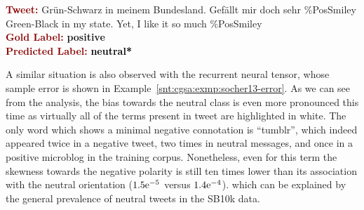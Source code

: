 \begin{example}\label{snt:cgsa:exmp:rae-error}
  \noindent\textup{\bfseries\textcolor{darkred}{Tweet:}} {\upshape
    \colorbox{white!5}{Gr\"un}\colorbox{blue!11}{-}\colorbox{white!25.7}{Schwarz}
    \colorbox{white!5}{in} \colorbox{white!2.5!blue!1}{meinem}
    Bundesland. \colorbox{green!10}{Gef\"allt}
    \colorbox{white!5!blue!4.5}{mir} \colorbox{white!5!blue!5}{doch}
    \colorbox{white!4.6!blue!5}{sehr}
    \colorbox{white!5!blue!5}{\%PosSmiley}}\\
  \noindent \colorbox{white!5}{Green}\colorbox{blue!11}{-}\colorbox{white!25.7}{Black} \colorbox{white!5}{in} \colorbox{white!2.5!blue!1}{my} state.  \colorbox{white!5!blue!5}{Yet}, \colorbox{white!5!blue!4.5}{I} \colorbox{green!10}{like} it \colorbox{white!4.6!blue!5}{so much} \colorbox{white!5!blue!5}{\%PosSmiley}\\[\exampleSep]
  \noindent\textup{\bfseries\textcolor{darkred}{Gold Label:}}\hspace*{4.3em}\textbf{%
    \upshape\textcolor{green3}{positive}}\\
 \noindent\textup{\bfseries\textcolor{darkred}{Predicted Label:}}\hspace*{2em}\textbf{%
    \upshape\textcolor{black}{neutral*}}
\end{example}

A similar situation is also observed with the recurrent neural tensor,
whose sample error is shown in
Example~\ref{snt:cgsa:exmp:socher13-error}.  As we can see from the
analysis, the bias towards the neutral class is even more pronounced
this time as virtually all of the terms present in tweet are
highlighted in white.  The only word which shows a minimal negative
connotation is ``tumblr'', which indeed appeared twice in a negative
tweet, two times in neutral messages, and once in a positive microblog
in the training corpus.  Nonetheless, even for this term the skewness
towards the negative polarity is still ten times lower than its
association with the neutral orientation (${1.5}\mathrm{e}^{-5}$ versus
${1.4}\mathrm{e}^{-4}$). which can be explained by the general
prevalence of neutral tweets in the SB10k data.


